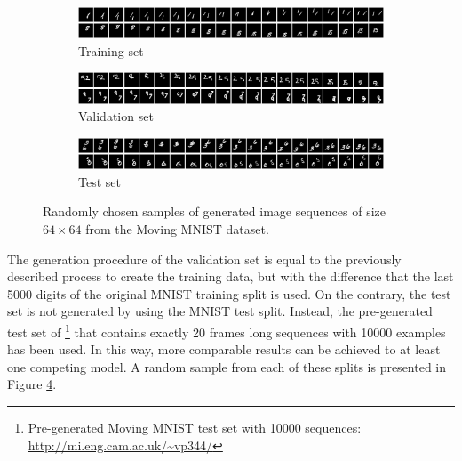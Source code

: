 \begin{figure}[htpb]
\centering
\begin{subfigure}{1.0\textwidth}
  \centering
  \includegraphics[width=1.0\linewidth]{figures/ds/mm_train.png}
  \caption{Training set}
  \label{fig:mm_train}
  \vspace{.1cm}
\end{subfigure}
\begin{subfigure}{1.0\textwidth}
  \centering
  \includegraphics[width=1.0\linewidth]{figures/ds/mm_valid.png}
  \caption{Validation set}
  \label{fig:mm_valid}
  \vspace{.1cm}
\end{subfigure}
\begin{subfigure}{1.0\textwidth}
  \centering
  \includegraphics[width=1.0\linewidth]{figures/ds/mm_test.png}
  \caption{Test set}
  \label{fig:mm_test}
\end{subfigure}
\caption[MovingMNIST Image Sequence Samples]{Randomly chosen samples of generated image sequences of size $64 \times 64$ from the Moving MNIST dataset.}
\label{fig:moving_mnist}
\end{figure}

The generation procedure of the validation set is equal to the previously described process to create the training data, but with the difference that the last \num{5000} digits of the original MNIST training split is used. On the contrary, the test set is not generated by using the MNIST test split. Instead, the pre-generated test set of \parencite{spat_temp_video_autoenc}\footnote{Pre-generated Moving MNIST test set with \num{10000} sequences: \url{http://mi.eng.cam.ac.uk/~vp344/}} that contains exactly \num{20} frames long sequences with \num{10000} examples has been used. In this way, more comparable results can be achieved to at least one competing model. A random sample from each of these splits is presented in Figure \ref{fig:moving_mnist}.

